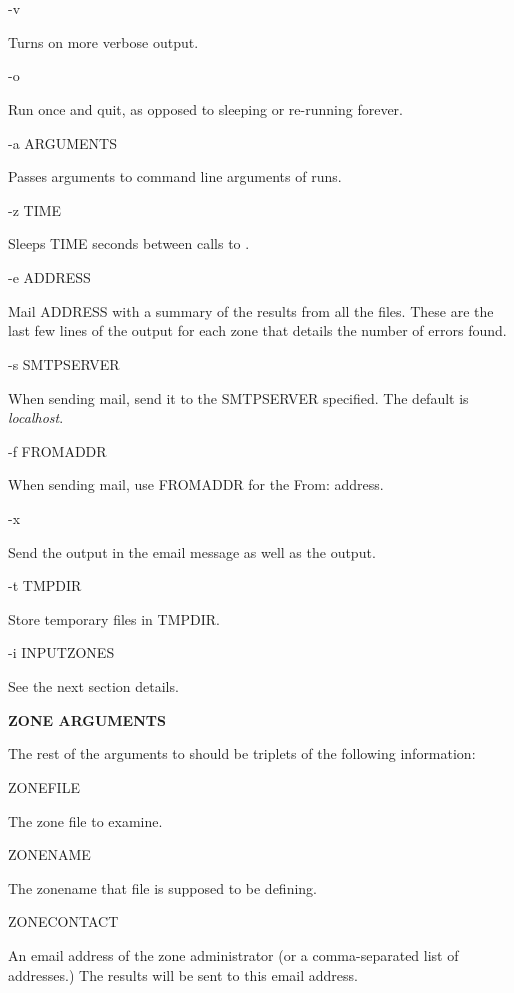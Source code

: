 \begin{description}

\item -v\verb" "

Turns on more verbose output.

\item -o\verb" "

Run once and quit, as opposed to sleeping or re-running forever.

\item -a ARGUMENTS\verb" "

Passes arguments to command line arguments of  runs.

\item -z TIME\verb" "

Sleeps TIME seconds between calls to .

\item -e ADDRESS\verb" "

Mail ADDRESS with a summary of the results from all the files.
These are the last few lines of the  output for each zone that
details the number of errors found.

\item -s SMTPSERVER\verb" "

When sending mail, send it to the SMTPSERVER specified.  The default
is {\it localhost}.

\item -f FROMADDR\verb" "

When sending mail, use FROMADDR for the From: address.

\item -x\verb" "

Send the  output in the email message as well as the 
output.

\item -t TMPDIR\verb" "

Store temporary files in TMPDIR.

\item -i INPUTZONES\verb" "

See the next section details.

\end{description}

{\bf ZONE ARGUMENTS}

The rest of the arguments to  should be triplets of the
following information:

\begin{description}

\item ZONEFILE\verb" "

The zone file to examine.

\item ZONENAME\verb" "

The zonename that file is supposed to be defining.

\item ZONECONTACT\verb" "

An email address of the zone administrator (or a comma-separated
list of addresses.)  The results will be sent to this email address.

\end{description}

